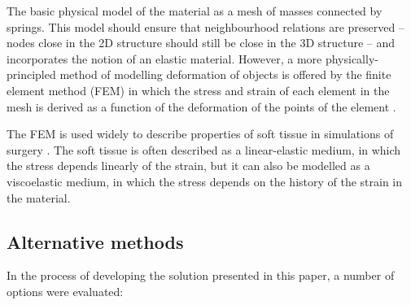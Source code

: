 \documentclass[10pt]{article}
\begin{document}
The basic physical model of the material as a mesh of masses connected
by springs. This model should ensure that neighbourhood relations are
preserved -- nodes close in the 2D structure should still be close in
the 3D structure -- and incorporates the notion of an elastic
material. However, a more physically-principled method of modelling
deformation of objects is offered by the finite element method (FEM)
in which the stress and strain of each element in the mesh is derived
as a function of the deformation of the points of the element
\cite{ZienTayl00fini}.

The FEM is used widely to describe properties of soft tissue in
simulations of surgery \cite{CartEtal05appl}. The soft tissue is
often described as a linear-elastic medium, in which the stress
depends linearly of the strain, but it can also be modelled as a
viscoelastic medium, in which the stress depends on the history of the
strain in the material. 



\subsection*{Alternative methods}
\label{fold-sphere:sec:alternative-methods}

In the process of developing the solution presented in this paper, a
number of options were evaluated:
\end{document}
